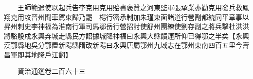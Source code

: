 　　王師範遣使以起兵告李克用克用貽書褒贊之河東監軍張承業亦勸克用發兵救鳳翔克用攻晉州聞車駕東歸乃罷　楊行密承制加朱瑾東面諸道行營副都統同平章事以昇州刺史李神福為淮南行軍司馬鄂岳行營招討使舒州團練使劉存副之將兵擊杜洪洪將駱殷戍永興弃城走縣民方詔據城降神福曰永興大縣饋運所仰已得鄂之半矣【永興漢鄂縣地吳分鄂置新陽縣隋改新陽曰永興唐屬鄂州九域志在鄂州東南四百五里今壽昌軍即其地降戶江翻】

　　資治通鑑卷二百六十三  
    


 


 



 

 
  







 


　　
　　
　
　
　


　　

　















	
	









































 
  



















 





 












  
  
  

 





